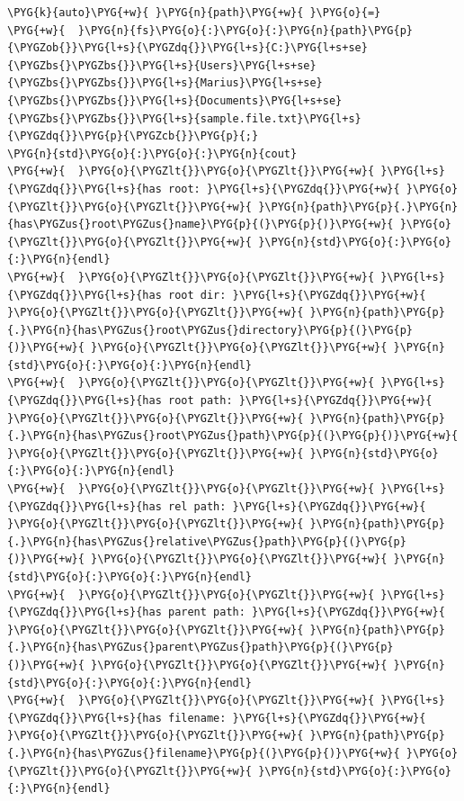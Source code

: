 \begin{itemize}
\begin{codeblockbg}
\begin{Verbatim}[commandchars=\\\{\},breaklines=true,breakanywhere=true,fontsize=\codefont,xleftmargin=17bp]
\PYG{k}{auto}\PYG{+w}{ }\PYG{n}{path}\PYG{+w}{ }\PYG{o}{=}
\PYG{+w}{  }\PYG{n}{fs}\PYG{o}{:}\PYG{o}{:}\PYG{n}{path}\PYG{p}{\PYGZob{}}\PYG{l+s}{\PYGZdq{}}\PYG{l+s}{C:}\PYG{l+s+se}{\PYGZbs{}\PYGZbs{}}\PYG{l+s}{Users}\PYG{l+s+se}{\PYGZbs{}\PYGZbs{}}\PYG{l+s}{Marius}\PYG{l+s+se}{\PYGZbs{}\PYGZbs{}}\PYG{l+s}{Documents}\PYG{l+s+se}{\PYGZbs{}\PYGZbs{}}\PYG{l+s}{sample.file.txt}\PYG{l+s}{\PYGZdq{}}\PYG{p}{\PYGZcb{}}\PYG{p}{;}
\PYG{n}{std}\PYG{o}{:}\PYG{o}{:}\PYG{n}{cout}
\PYG{+w}{  }\PYG{o}{\PYGZlt{}}\PYG{o}{\PYGZlt{}}\PYG{+w}{ }\PYG{l+s}{\PYGZdq{}}\PYG{l+s}{has root: }\PYG{l+s}{\PYGZdq{}}\PYG{+w}{ }\PYG{o}{\PYGZlt{}}\PYG{o}{\PYGZlt{}}\PYG{+w}{ }\PYG{n}{path}\PYG{p}{.}\PYG{n}{has\PYGZus{}root\PYGZus{}name}\PYG{p}{(}\PYG{p}{)}\PYG{+w}{ }\PYG{o}{\PYGZlt{}}\PYG{o}{\PYGZlt{}}\PYG{+w}{ }\PYG{n}{std}\PYG{o}{:}\PYG{o}{:}\PYG{n}{endl}
\PYG{+w}{  }\PYG{o}{\PYGZlt{}}\PYG{o}{\PYGZlt{}}\PYG{+w}{ }\PYG{l+s}{\PYGZdq{}}\PYG{l+s}{has root dir: }\PYG{l+s}{\PYGZdq{}}\PYG{+w}{ }\PYG{o}{\PYGZlt{}}\PYG{o}{\PYGZlt{}}\PYG{+w}{ }\PYG{n}{path}\PYG{p}{.}\PYG{n}{has\PYGZus{}root\PYGZus{}directory}\PYG{p}{(}\PYG{p}{)}\PYG{+w}{ }\PYG{o}{\PYGZlt{}}\PYG{o}{\PYGZlt{}}\PYG{+w}{ }\PYG{n}{std}\PYG{o}{:}\PYG{o}{:}\PYG{n}{endl}
\PYG{+w}{  }\PYG{o}{\PYGZlt{}}\PYG{o}{\PYGZlt{}}\PYG{+w}{ }\PYG{l+s}{\PYGZdq{}}\PYG{l+s}{has root path: }\PYG{l+s}{\PYGZdq{}}\PYG{+w}{ }\PYG{o}{\PYGZlt{}}\PYG{o}{\PYGZlt{}}\PYG{+w}{ }\PYG{n}{path}\PYG{p}{.}\PYG{n}{has\PYGZus{}root\PYGZus{}path}\PYG{p}{(}\PYG{p}{)}\PYG{+w}{ }\PYG{o}{\PYGZlt{}}\PYG{o}{\PYGZlt{}}\PYG{+w}{ }\PYG{n}{std}\PYG{o}{:}\PYG{o}{:}\PYG{n}{endl}
\PYG{+w}{  }\PYG{o}{\PYGZlt{}}\PYG{o}{\PYGZlt{}}\PYG{+w}{ }\PYG{l+s}{\PYGZdq{}}\PYG{l+s}{has rel path: }\PYG{l+s}{\PYGZdq{}}\PYG{+w}{ }\PYG{o}{\PYGZlt{}}\PYG{o}{\PYGZlt{}}\PYG{+w}{ }\PYG{n}{path}\PYG{p}{.}\PYG{n}{has\PYGZus{}relative\PYGZus{}path}\PYG{p}{(}\PYG{p}{)}\PYG{+w}{ }\PYG{o}{\PYGZlt{}}\PYG{o}{\PYGZlt{}}\PYG{+w}{ }\PYG{n}{std}\PYG{o}{:}\PYG{o}{:}\PYG{n}{endl}
\PYG{+w}{  }\PYG{o}{\PYGZlt{}}\PYG{o}{\PYGZlt{}}\PYG{+w}{ }\PYG{l+s}{\PYGZdq{}}\PYG{l+s}{has parent path: }\PYG{l+s}{\PYGZdq{}}\PYG{+w}{ }\PYG{o}{\PYGZlt{}}\PYG{o}{\PYGZlt{}}\PYG{+w}{ }\PYG{n}{path}\PYG{p}{.}\PYG{n}{has\PYGZus{}parent\PYGZus{}path}\PYG{p}{(}\PYG{p}{)}\PYG{+w}{ }\PYG{o}{\PYGZlt{}}\PYG{o}{\PYGZlt{}}\PYG{+w}{ }\PYG{n}{std}\PYG{o}{:}\PYG{o}{:}\PYG{n}{endl}
\PYG{+w}{  }\PYG{o}{\PYGZlt{}}\PYG{o}{\PYGZlt{}}\PYG{+w}{ }\PYG{l+s}{\PYGZdq{}}\PYG{l+s}{has filename: }\PYG{l+s}{\PYGZdq{}}\PYG{+w}{ }\PYG{o}{\PYGZlt{}}\PYG{o}{\PYGZlt{}}\PYG{+w}{ }\PYG{n}{path}\PYG{p}{.}\PYG{n}{has\PYGZus{}filename}\PYG{p}{(}\PYG{p}{)}\PYG{+w}{ }\PYG{o}{\PYGZlt{}}\PYG{o}{\PYGZlt{}}\PYG{+w}{ }\PYG{n}{std}\PYG{o}{:}\PYG{o}{:}\PYG{n}{endl}

\end{Verbatim}
\end{codeblockbg}
\end{itemize}
